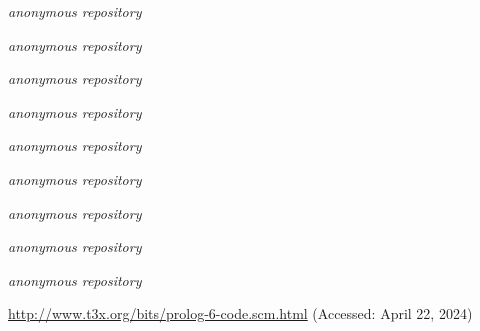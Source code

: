 \documentclass[10pt,anonymous,review]{acmart}
\begin{document}
\begin{thebibliography}{9}
\emph{anonymous repository}

\emph{anonymous repository}

\emph{anonymous repository}

\emph{anonymous repository}

\emph{anonymous repository}

\emph{anonymous repository}

\emph{anonymous repository}

\emph{anonymous repository}

\emph{anonymous repository}

\url{http://www.t3x.org/bits/prolog-6-code.scm.html} (Accessed: April 22, 2024)

\end{thebibliography}
\end{document}
